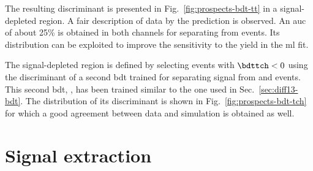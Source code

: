 The resulting \bdttt discriminant is presented in Fig.~\ref{fig:prospects-bdt-tt} in a signal-depleted region. A fair description of data by the prediction is observed. An \gls{auc} of about 25\% is obtained in both channels for separating \ttbar from \wjets events. Its distribution can be exploited to improve the sensitivity to the \wjets yield in the \gls{ml} fit.


The signal-depleted region is defined by selecting events with $\bdttch<0$ using the discriminant of a second \gls{bdt} trained for separating signal from \wjets and \ttbar events. This second \gls{bdt}, \bdttch, has been trained similar to the one used in Sec.~\ref{sec:diff13-bdt}. The distribution of its discriminant is shown in Fig.~\ref{fig:prospects-bdt-tch} for which a good agreement between data and simulation is obtained as well.


\section{Signal extraction}
\label{sec:prospects-fit}

